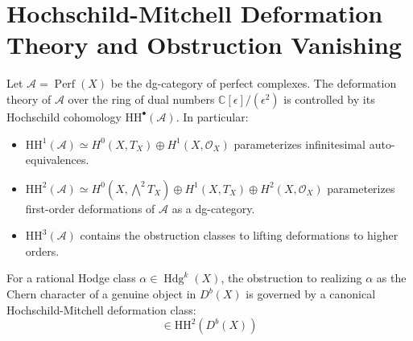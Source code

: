 \documentclass[11pt,a4paper]{article}
\theoremstyle{definition}
\begin{document}
\section{Hochschild-Mitchell Deformation Theory and Obstruction Vanishing}
Let $\mathcal{A} = \operatorname{Perf}(X)$ be the dg-category of perfect complexes.
The deformation theory of $\mathcal{A}$ over the ring of dual numbers $\mathbb{C}[\epsilon]/(\epsilon^2)$ is controlled by its Hochschild cohomology $\mathrm{HH}^\bullet(\mathcal{A})$.
In particular:
\begin{itemize}
    \item $\mathrm{HH}^1(\mathcal{A}) \simeq H^0(X, T_X) \oplus H^1(X, \mathcal{O}_X)$ parameterizes infinitesimal auto-equivalences.
    \item $\mathrm{HH}^2(\mathcal{A}) \simeq H^0(X, \bigwedge^2 T_X) \oplus H^1(X, T_X) \oplus H^2(X, \mathcal{O}_X)$ parameterizes first-order deformations of $\mathcal{A}$ as a dg-category.
    \item $\mathrm{HH}^3(\mathcal{A})$ contains the obstruction classes to lifting deformations to higher orders.
\end{itemize}

For a rational Hodge class $\alpha \in \operatorname{Hdg}^k(X)$, the obstruction to realizing $\alpha$ as the Chern character of a genuine object in $D^b(X)$ is governed by a canonical Hochschild-Mitchell deformation class:
\begin{equation}
[\theta_\alpha] \in \mathrm{HH}^2(D^b(X))
\end{equation}
\end{document}
